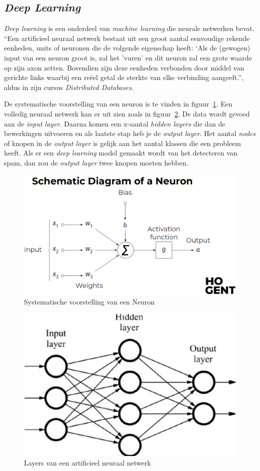 \subsection{\textit{Deep Learning}}
\textit{Deep learning} is een onderdeel van \textit{machine learning} die neurale netwerken bevat.
``Een artificieel neuraal netwerk bestaat uit een groot aantal eenvoudige rekende eenheden, units of neuronen die de volgende eigenschap heeft: `Als de (gewogen) input van een neuron groot is, zal het 'vuren' en dit neuron zal een grote waarde op zijn axon zetten. Bovendien zijn deze eenheden verbonden door middel van gerichte links waarbij een reëel getal de sterkte van elke verbinding aangeeft.'', aldus \textcite{Lievens2021} in zijn cursus \textit{Distributed Databases}.

De systematische voorstelling van een neuron is te vinden in figuur~\ref{fig:neuron}.
Een volledig neuraal netwerk kan er uit zien zoals in figuur~\ref{fig:layers}. De data wordt gevoed aan de \textit{input layer}. Daarna komen een x-aantal \textit{hidden layers} die dan de bewerkingen uitvoeren en als laatste stap heb je de \textit{output layer}. Het aantal \textit{nodes} of knopen in de \textit{output layer} is gelijk aan het aantal klassen die een probleem heeft. Als er een \textit{deep learning} model gemaakt wordt van het detecteren van spam, dan zou de \textit{output layer} twee knopen moeten hebben.

\begin{figure}
    \centering
    \includegraphics[width=1\textwidth]{./img/neuron.png}
    \caption{\label{fig:neuron} Systematische voorstelling van een Neuron~\autocite{Lievens2021}}
\end{figure}

\begin{figure}
    \centering
    \includegraphics[width=.5\textwidth]{./img/layers.jpg}
    \caption{\label{fig:layers} Layers van een artificieel neuraal netwerk~\autocite{Lievens2021}}
\end{figure}


